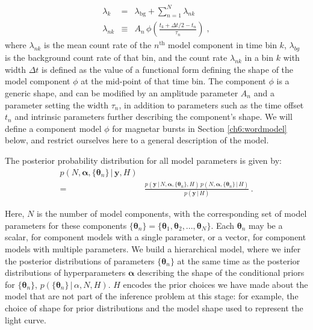 \documentclass[12pt]{emulateapj}
\newcommand{\given}{\,|\,}
\newcommand{\counts}{y}
\newcommand{\pars}{\theta}
\newcommand{\mean}{\lambda}
\newcommand{\Poisson}{{\mathcal P}}
\newcommand{\bg}{\mathrm{bg}}
\newcommand{\word}{\phi}
\begin{document}
\begin{eqnarray}
\mean_k &=& \mean_{\bg} + \sum_{n=1}^N \mean_{nk}
\\
\mean_{nk} &\equiv& A_n\,\word\left(\frac{t_k+\Delta t/2-t_n}{\tau_n}\right) \; ,
\end{eqnarray}
where $\mean_{nk}$ is the mean count rate of the $n^{\mathrm{th}}$ model component in time bin $k$, 
$\mean_{bg}$ is the background count rate of that bin,
and the count rate $\mean_{nk}$ in a bin $k$ with width $\Delta t$ is defined as the value of a functional form defining the shape of
the model component $\word$ at the mid-point of that time bin. The component $\word$ is a generic shape,
and can be modified by an amplitude parameter $A_n$ and a parameter setting the width $\tau_n$, in addition to
parameters such as the time offset $t_n$ and intrinsic parameters further describing the component's shape.
We will define a component model $\word$ for magnetar bursts in Section \ref{ch6:wordmodel} below, and
restrict ourselves here to a general description of the model.

The posterior probability distribution for all model parameters is given by:
\begin{eqnarray}
p(N, \bm{\alpha},\{\bm{\theta}_n \} \given \bm{\counts}, H) &   \\\nonumber
 						 = & \frac{p(\bm{\counts} \given N, \bm{\alpha}, \{\bm{\theta}_n \}, H)\, p(N, \bm{\alpha}, \{\bm{\theta}_n \} \given H)}{p(\bm{\counts} \given H)} \, .
\end{eqnarray}

Here, $N$ is the number of model components, with the corresponding set of model parameters for these components $\{\bm{\theta}_n\} = \{ \bm{\theta}_1, \bm{\theta}_2, ..., \bm{\theta}_N \}$. Each $\bm{\theta}_n$ may be a scalar, for component models with a single parameter, or a vector, for component models with multiple parameters. 
We build a hierarchical model, where we infer the posterior distributions of parameters $\{\bm{\theta}_n\}$ at the same time as the posterior distributions of hyperparameters $\bm{\alpha}$ describing the shape
of the conditional priors for  $\{\bm{\theta}_n\}$, $p(\{\bm{\theta}_n\}\given \alpha, N, H)$.
$H$ encodes the prior choices we have
made about the model that are not part of the inference problem at this stage: for example, the choice of shape for prior distributions and the model shape used to represent the light curve.
\end{document}
